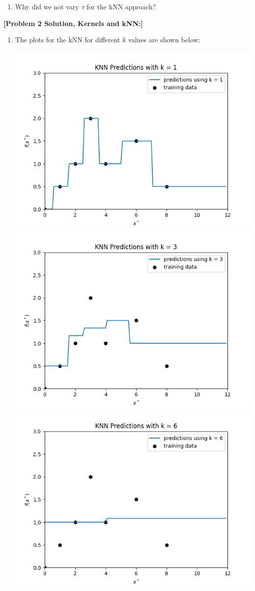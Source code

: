 \documentclass[submit]{harvardml}
\begin{document}
\begin{problem}
\begin{enumerate}
\item Why did we not vary $\tau$ for the kNN approach?

\end{enumerate}

\end{problem}

\newpage

\begin{solution}\textbf{[Problem 2 Solution, Kernels and kNN:]}
    \begin{enumerate}
        \item The plots for the kNN for different $k$ values are shown below:
        
        
        \includegraphics[width=0.55\columnwidth]{k1.png}
        \includegraphics[width=0.55\columnwidth]{k3.png}
        \includegraphics[width=0.55\columnwidth]{k6.png}
        

\end{enumerate}
\end{solution}
\end{document}
